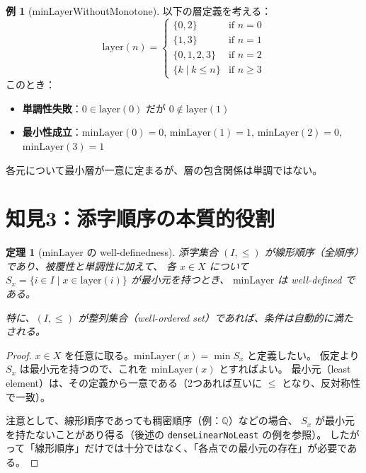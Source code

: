 \documentclass[a4paper,11pt]{ltjsarticle}
\theoremstyle{definition}
\newtheorem{example}[definition]{例}
\theoremstyle{plain}
\newtheorem{theorem}[definition]{定理}
\theoremstyle{remark}
\newcommand{\Layer}{\mathrm{layer}}
\newcommand{\minLayer}{\mathrm{minLayer}}
\begin{document}
\begin{example}[minLayerWithoutMonotone]
以下の層定義を考える：
\[
\Layer(n) = \begin{cases}
    \{0, 2\} & \text{if } n = 0 \\
    \{1, 3\} & \text{if } n = 1 \\
    \{0, 1, 2, 3\} & \text{if } n = 2 \\
    \{k \mid k \leq n\} & \text{if } n \geq 3
\end{cases}
\]
このとき：
\begin{itemize}
    \item \textbf{単調性失敗}：$0 \in \Layer(0)$ だが $0 \notin \Layer(1)$
    \item \textbf{最小性成立}：$\minLayer(0) = 0$, $\minLayer(1) = 1$, $\minLayer(2) = 0$, $\minLayer(3) = 1$
\end{itemize}
各元について最小層が一意に定まるが、層の包含関係は単調ではない。
\end{example}

\section{知見3：添字順序の本質的役割}

\begin{theorem}[$\minLayer$ の well-definedness]\label{thm:linear}
添字集合 $(I, \leq)$ が線形順序（全順序）であり、被覆性と単調性に加えて、
各 $x \in X$ について $S_x = \{i \in I \mid x \in \Layer(i)\}$ が最小元を持つとき、
$\minLayer$ は well-defined である。

特に、$(I, \leq)$ が整列集合（well-ordered set）であれば、条件は自動的に満たされる。
\end{theorem}

\begin{proof}
$x \in X$ を任意に取る。$\minLayer(x) = \min S_x$ と定義したい。
仮定より $S_x$ は最小元を持つので、これを $\minLayer(x)$ とすればよい。
最小元（least element）は、その定義から一意である（2つあれば互いに $\leq$ となり、反対称性で一致）。

注意として、線形順序であっても稠密順序（例：$\mathbb{Q}$）などの場合、
$S_x$ が最小元を持たないことがあり得る（後述の \texttt{denseLinearNoLeast} の例を参照）。
したがって「線形順序」だけでは十分ではなく、「各点での最小元の存在」が必要である。
\end{proof}
\end{document}
